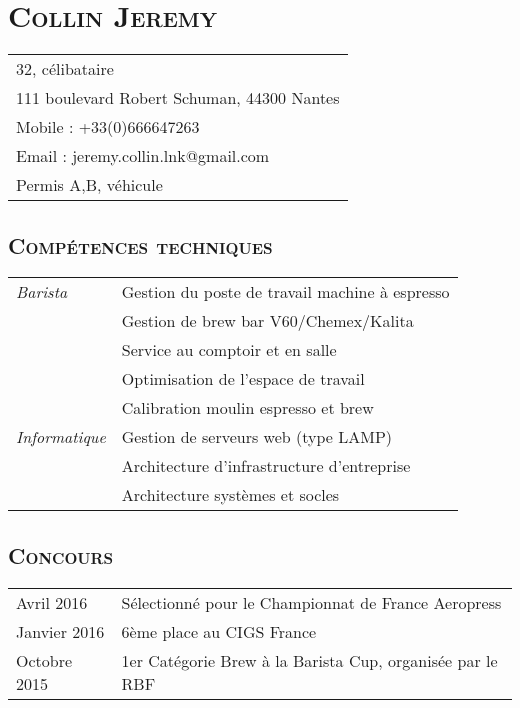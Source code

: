 \documentclass[a4paper]{article}
\newcommand{\hsection}[1]{\section*{\fontfamily{phv}\selectfont\textsc{#1}}}
\newcommand{\hsubsection}[1]{\subsection*{\fontfamily{phv}\selectfont\textsc{#1}}}
\begin{document}
\selectfont
\hsection{Collin Jeremy}
\begin{tabular}{p{16.5cm}}
\hline
32, célibataire\\
111 boulevard Robert Schuman, 44300 Nantes\\
Mobile : +33(0)666647263\\
Email : jeremy.collin.lnk@gmail.com\\
Permis A,B, véhicule\\
\end{tabular}
\hsubsection{Compétences techniques}
\begin{tabular}{P{3.5cm}|p{13cm}}
\textsl{Barista}	& Gestion du poste de travail machine à espresso\\
 & Gestion de brew bar V60/Chemex/Kalita\\
 & Service au comptoir et en salle\\
 & Optimisation de l’espace de travail\\
 & Calibration moulin espresso et brew\\

\textsl{Informatique}	& Gestion de serveurs web (type LAMP)\\
			& Architecture d’infrastructure d’entreprise \\
			& Architecture systèmes et socles\\
\end{tabular}

\hsubsection{Concours}
\begin{tabular}{P{3.5cm}|p{13cm}}
Avril 2016	& Sélectionné pour le Championnat de France Aeropress\\
Janvier 2016	& 6ème place au CIGS France\\
Octobre 2015	& 1er Catégorie Brew à la Barista Cup, organisée par le RBF\\
\end{tabular}
\end{document}
